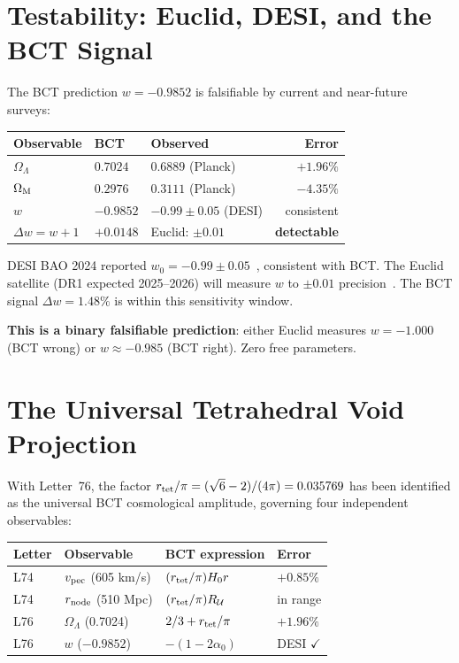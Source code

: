 \documentclass[aps,prl,twocolumn,showpacs,superscriptaddress]{revtex4-2}
\begin{document}
\section{Testability: Euclid, DESI, and the BCT Signal}

The BCT prediction $w = -0.9852$ is falsifiable by current and near-future surveys:

\begin{center}
\begin{tabular}{lllr}
\toprule
Observable & BCT & Observed & Error \\
\midrule
$\Omega_\Lambda$ & $0.7024$ & $0.6889$ (Planck) & $+1.96\%$ \\
$\Omega_{\rm M}$ & $0.2976$ & $0.3111$ (Planck) & $-4.35\%$ \\
$w$ & $-0.9852$ & $-0.99\pm0.05$ (DESI) & consistent \\
$\Delta w = w+1$ & $+0.0148$ & Euclid: $\pm 0.01$ & \textbf{detectable} \\
\bottomrule
\end{tabular}
\end{center}

DESI BAO 2024 reported $w_0 = -0.99 \pm 0.05$~\cite{DESI2024}, consistent with 
BCT. The Euclid satellite (DR1 expected 2025--2026) will measure $w$ to $\pm 0.01$ 
precision~\cite{Euclid2024}. The BCT signal $\Delta w = 1.48\%$ is within this 
sensitivity window.

\textbf{This is a binary falsifiable prediction}: either Euclid measures $w = -1.000$ 
(BCT wrong) or $w \approx -0.985$ (BCT right). Zero free parameters.

\section{The Universal Tetrahedral Void Projection}

With Letter~76, the factor $r_{\rm tet}/\pi = (\sqrt{6}-2)/(4\pi) = 0.035769$ 
has been identified as the universal BCT cosmological amplitude, governing four 
independent observables:

\begin{center}
\begin{tabular}{llll}
\toprule
Letter & Observable & BCT expression & Error \\
\midrule
L74 & $v_{\rm pec}$ (605 km/s) & $(r_{\rm tet}/\pi) H_0 r$ & $+0.85\%$ \\
L74 & $r_{\rm node}$ (510 Mpc) & $(r_{\rm tet}/\pi) R_\mathcal{U}$ & in range \\
L76 & $\Omega_\Lambda$ (0.7024) & $2/3 + r_{\rm tet}/\pi$ & $+1.96\%$ \\
L76 & $w$ ($-0.9852$) & $-(1-2\alpha_0)$ & DESI $\checkmark$ \\
\bottomrule
\end{tabular}
\end{center}
\end{document}
